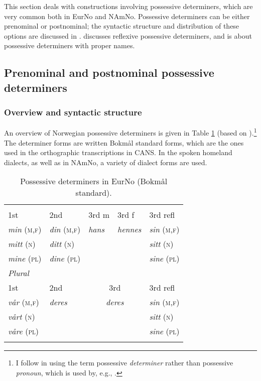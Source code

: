 \documentclass[output=paper,colorlinks,citecolor=brown]{langscibook}
\begin{document}
This section deals with constructions involving possessive determiners, which are very common both in EurNo and NAmNo. Possessive determiners can be either prenominal or postnominal; the syntactic structure and distribution of these options are discussed in .  discusses reflexive possessive determiners, and   is about possessive determiners with proper names. 

\subsection{Prenominal and postnominal possessive determiners}\label{subsec:prenompostnomdet}


\subsubsection{Overview and syntactic structure}
An overview of  Norwegian possessive determiners is given in Table \ref{table:possdet} (based on \citealt[31]{faarlund2019syntax}).\footnote{I follow \citet{Faarlund2019} in using the term possessive \emph{determiner} rather than possessive \emph{pronoun}, which is used by, e.g., \citet{Julien2005}.} The determiner forms  are  written Bokmål standard forms, which are the ones used in the orthographic transcriptions in CANS. In the spoken homeland dialects, as well as in NAmNo, a variety of dialect forms are used.

\begin{table}
\begin{tabular}{ *5{l} }  
    \lsptoprule
    \multicolumn{5}{l}{\textit{Singular}}\\
    1st & 2nd & 3rd m & 3rd f & 3rd refl\\\midrule
    \emph{min} (\textsc{m,f}) & \emph{din} (\textsc{m,f})  & \emph{hans} & \emph{hennes} & \emph{sin} (\textsc{m,f})\\
    \emph{mitt} (\textsc{n}) & \emph{ditt} (\textsc{n})& & & \emph{sitt} (\textsc{n})\\    
    \emph{mine} (\textsc{pl}) &  \emph{dine} (\textsc{pl})& & & \emph{sine} (\textsc{pl})\\\midrule    
    \multicolumn{5}{l}{\textit{Plural}}\\
    1st & 2nd & \multicolumn{2}{c}{3rd} & 3rd refl \\\midrule
    \emph{vår}  (\textsc{m,f}) & \emph{deres} & \multicolumn{2}{c}{\emph{deres}} & \emph{sin} (\textsc{m,f})\\
    \emph{vårt} (\textsc{n})  & & & & \emph{sitt} (\textsc{n}) \\
    \emph{våre} (\textsc{pl}) & & & & \emph{sine} (\textsc{pl}) \\
    \lspbottomrule
\end{tabular}
\caption{Possessive determiners in  EurNo (Bokmål standard).}
\label{table:possdet}
\end{table}
\end{document}
